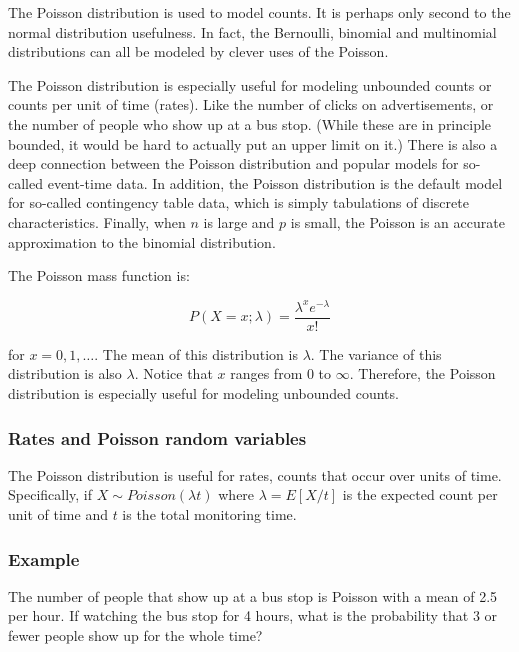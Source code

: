 \documentclass[]{article}
\begin{document}
The Poisson distribution is used to model counts. It is perhaps only
second to the normal distribution usefulness. In fact, the Bernoulli,
binomial and multinomial distributions can all be modeled by clever uses
of the Poisson.

The Poisson distribution is especially useful for modeling unbounded
counts or counts per unit of time (rates). Like the number of clicks on
advertisements, or the number of people who show up at a bus stop.
(While these are in principle bounded, it would be hard to actually put
an upper limit on it.) There is also a deep connection between the
Poisson distribution and popular models for so-called event-time data.
In addition, the Poisson distribution is the default model for so-called
contingency table data, which is simply tabulations of discrete
characteristics. Finally, when $n$ is large and $p$ is small, the
Poisson is an accurate approximation to the binomial distribution.

The Poisson mass function is:

\[
P(X = x; \lambda) = \frac{\lambda^x e^{-\lambda}}{x!}
\]

for $x=0,1,\ldots$. The mean of this distribution is $\lambda$. The
variance of this distribution is also $\lambda$. Notice that $x$ ranges
from 0 to $\infty$. Therefore, the Poisson distribution is especially
useful for modeling unbounded counts.

\subsubsection{Rates and Poisson random
variables}\label{rates-and-poisson-random-variables}

The Poisson distribution is useful for rates, counts that occur over
units of time. Specifically, if $X \sim Poisson(\lambda t)$ where
$\lambda = E[X / t]$ is the expected count per unit of time and $t$ is
the total monitoring time.

\subsubsection{Example}\label{example-14}

The number of people that show up at a bus stop is Poisson with a mean
of 2.5 per hour. If watching the bus stop for 4 hours, what is the
probability that $3$ or fewer people show up for the whole time?

\vspace{1pc}
\end{document}
